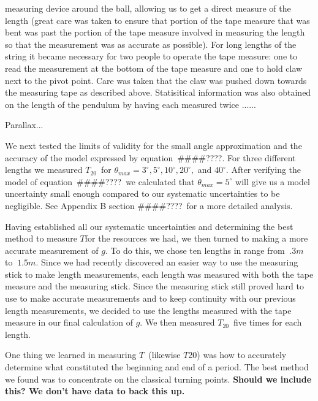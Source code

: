 \documentclass[iop]{emulateapj}
\def\g{$g$}
\def\T{$T$}
\def\Ttwen{$T_{20}$}
\def\fillin{\#\#\#\#????}
\def\deg{^{\circ}}
\begin{document}
measuring device around the ball, allowing us to get a direct measure of the 
length (great care was taken to ensure that portion of the tape measure that 
was bent was past the portion of the tape measure involved in measuring the 
length so that the measurement was as accurate as possible). For long lengths 
of the string it became necessary for two people to operate the tape measure:
one to read the measurement at the bottom of the tape measure and one to hold 
claw next to the pivot point.  Care was taken that the claw was pushed down 
towards the measuring tape as described above.  Statisitical information was 
also obtained on the length of the pendulum by having each measured twice
......%

Parallax...

We next tested the limits of validity for the small angle approximation and 
the accuracy of the model expressed by equation~\fillin. %
For three different lengths we measured \Ttwen\ for $\theta_{max} = 3\deg, 
5\deg, 10\deg, 20\deg,$ and $40\deg$.  %
After verifying the model of equation~\fillin\ we calculated that 
$\theta_{max}=5\deg$ will give us a model uncertainty small enough compared 
to our systematic uncertainties to be negligible.  See Appendix B section 
\fillin\ for a more detailed analysis.

Having established all our systematic uncertainties and determining the best 
method to measure \T for the resources we had, we then turned to making a more 
accurate measurement of \g.  To do this, we chose ten lengths in range from 
$~.3m$ to $~1.5m$.  Since we had recently discovered an easier way to use the 
measuring stick to make length measurements, each length was measured with 
both the tape measure and the measuring stick.  Since the measuring stick 
still proved hard to use to make accurate measurements and to keep continuity 
with our previous length measurements, we decided to use the lengths measured 
with the tape measure in our final calculation of \g. We then measured 
\Ttwen\ five times for each length.  

One thing we learned in measuring \T\ (likewise \T20) was how to accurately 
determine what constituted the beginning and end of a period.  The best 
method we found was to concentrate on the classical turning points. {\bf 
Should we include this?  We don't have data to back this up.}
\end{document}
